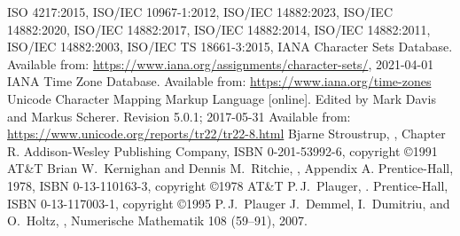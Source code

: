 
\renewcommand{\leftmark}{\bibname}

\begin{thebibliography}{99}
  ISO 4217:2015,
  ISO/IEC 10967-1:2012,
  ISO/IEC 14882:2023,
  ISO/IEC 14882:2020,
  ISO/IEC 14882:2017,
  ISO/IEC 14882:2014,
  ISO/IEC 14882:2011,
  ISO/IEC 14882:2003,
  ISO/IEC TS 18661-3:2015,
  IANA Character Sets Database.
  Available from:\newline
  \url{https://www.iana.org/assignments/character-sets/}, 2021-04-01
  IANA Time Zone Database.
  Available from: \url{https://www.iana.org/time-zones}
  Unicode Character Mapping Markup Language [online].
  Edited by Mark Davis and Markus Scherer. Revision 5.0.1; 2017-05-31
  Available from: \url{https://www.unicode.org/reports/tr22/tr22-8.html}
  Bjarne Stroustrup,
  , Chapter R\@.
  Addison-Wesley Publishing Company, ISBN 0-201-53992-6, copyright \copyright 1991 AT\&T
  Brian W.\ Kernighan and Dennis M.\ Ritchie,
  , Appendix A\@.
  Prentice-Hall, 1978, ISBN 0-13-110163-3, copyright \copyright 1978 AT\&T
  P.\,J.\ Plauger,
  .
  Prentice-Hall, ISBN 0-13-117003-1, copyright \copyright 1995 P.\,J.\ Plauger
  J.\ Demmel, I.\ Dumitriu, and O.\ Holtz,
  ,
  Numerische Mathematik 108 (59--91), 2007.

\end{thebibliography}
